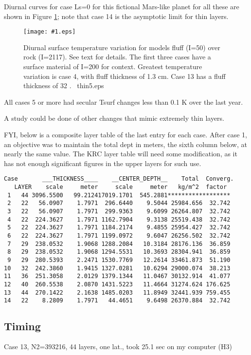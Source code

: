 \documentclass{article}  %
\newcommand{\igc}[1]{\texttt{[image: \#1.eps]}}  %
\begin{document}
Diurnal curves for case Ls=0 for this fictional Mars-like planet for all these
are shown in Figure \ref{thin5}; note that case 14 is the asymptotic
limit for thin layers.

\begin{figure}[!ht] \igc{img/thin5}
\caption[Thin surface layer]{Diurnal surface temperature variation for models
  fluff (I=50) over rock (I=2117). See text for details. The first three cases
  have a surface material of I=200 for context. Greatest temperature variation
  is case 4, with fluff thickness of 1.3 cm. Case 13 has a fluff thickness of 32
  \um.  \ thin5.eps \label{thin5} } \end{figure}

All cases 5 or more had secular Tsurf changes less than 0.1 K over the last year.

A study could be done of other changes that mimic extremely thin layers.

\newpage
FYI, below is a composite layer table of the last entry for each case. After
case 1, an objective was to maintain the total dept in meters, the sixth column
below, at nearly the same value. The KRC layer table will need some
modification, as it has not enough significant figures in the upper layers for
such use.

\begin{verbatim}
Case       ___THICKNESS____    __CENTER_DEPTH__    Total  Converg.
   LAYER    scale     meter     scale     meter   kg/m^2  factor
 1   44 3096.5500   99.212417019.1701  545.2881******************
 2   22   56.0907    1.7971  296.6440    9.5044 25984.656  32.742
 3   22   56.0907    1.7971  299.9363    9.6099 26264.807  32.742
 4   22  224.3627    1.7971 1162.7904    9.3138 25519.438  32.742
 5   22  224.3627    1.7971 1184.2174    9.4855 25954.427  32.742
 6   22  224.3627    1.7971 1199.0972    9.6047 26256.502  32.742
 7   29  238.0532    1.9068 1288.2084   10.3184 28176.136  36.859
 8   29  238.0532    1.9068 1294.5531   10.3693 28304.941  36.859
 9   29  280.5393    2.2471 1530.7769   12.2614 33461.873  51.190
10   32  242.3860    1.9415 1327.0281   10.6294 29000.074  38.213
11   36  251.3058    2.0129 1379.1344   11.0467 30132.914  41.077
12   40  260.5538    2.0870 1431.5223   11.4664 31274.624 176.625
13   44  270.1422    2.1638 1485.0203   11.8949 32441.939 759.455
14   22    8.2809    1.7971   44.4651    9.6498 26370.884  32.742
\end{verbatim}

\subsection{Timing} %
Case 13, N2=393216, 44 layers, one lat., took 25.1 sec on my computer (H3)
\end{document}

